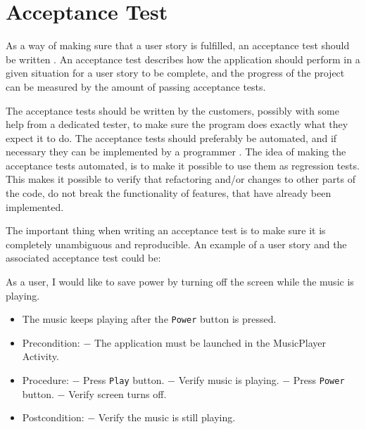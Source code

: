 \section{Acceptance Test}
As a way of making sure that a user story is fulfilled, an acceptance test should be written \citet[p. 126]{xp:explored}. An acceptance test describes how the application should perform in a given situation for a user story to be complete, and the progress of the project can be measured by the amount of passing acceptance tests.

The acceptance tests should be written by the customers, possibly with some help from a dedicated tester, to make sure the program does exactly what they expect it to do. The acceptance tests should preferably be automated, and if necessary they can be implemented by a programmer \citet[p. 126]{xp:explored}. The idea of making the acceptance tests automated, is to make it possible to use them as regression tests. This makes it possible to verify that refactoring and/or changes to other parts of the code, do not break the functionality of features, that have already been implemented.

The important thing when writing an acceptance test is to make sure it is completely unambiguous and reproducible. An example of a user story and the associated acceptance test could be:

{As a user, I would like to save power by turning off the screen while the music is playing.}
{\begin{itemize}
\item The music keeps playing after the \texttt{Power} button is pressed.
\end{itemize}}
{\begin{itemize}
\item Precondition: 
\subitem $-$ The application must be launched in the MusicPlayer Activity.

\item Procedure:
\subitem $-$ Press \texttt{Play} button.
\subitem $-$ Verify music is playing.
\subitem $-$ Press \texttt{Power} button.
\subitem $-$ Verify screen turns off.

\item Postcondition:
\subitem $-$ Verify the music is still playing.
\end{itemize}}


